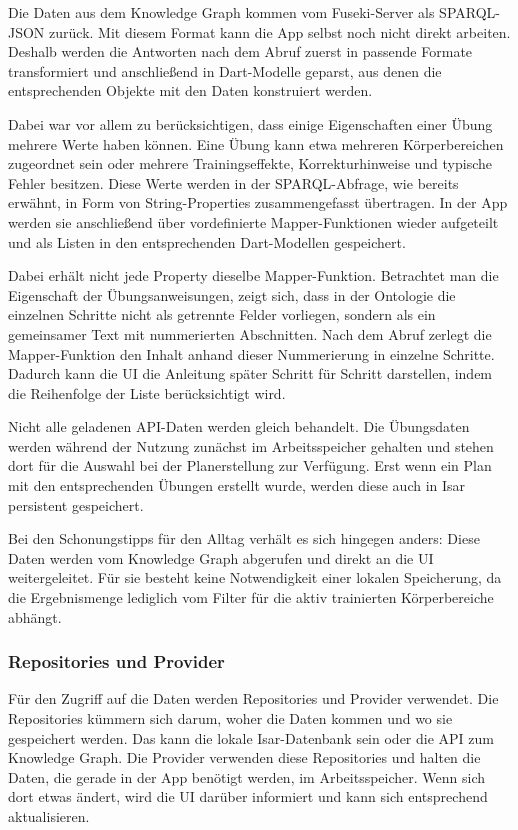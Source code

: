 Die Daten aus dem Knowledge Graph kommen vom Fuseki-Server als SPARQL-JSON zurück. Mit diesem Format kann die App selbst noch nicht direkt arbeiten. Deshalb werden die Antworten nach dem Abruf zuerst in passende Formate transformiert und anschließend in Dart-Modelle geparst, aus denen die entsprechenden Objekte mit den Daten konstruiert werden.

Dabei war vor allem zu berücksichtigen, dass einige Eigenschaften einer Übung mehrere Werte haben können. Eine Übung kann etwa mehreren Körperbereichen zugeordnet sein oder mehrere Trainingseffekte, Korrekturhinweise und typische Fehler besitzen. Diese Werte werden in der SPARQL-Abfrage, wie bereits erwähnt, in Form von String-Properties zusammengefasst übertragen. In der App werden sie anschließend über vordefinierte Mapper-Funktionen wieder aufgeteilt und als Listen in den entsprechenden Dart-Modellen gespeichert.

Dabei erhält nicht jede Property dieselbe Mapper-Funktion. Betrachtet man die Eigenschaft der Übungsanweisungen, zeigt sich, dass in der Ontologie die einzelnen Schritte nicht als getrennte Felder vorliegen, sondern als ein gemeinsamer Text mit nummerierten Abschnitten. Nach dem Abruf zerlegt die Mapper-Funktion den Inhalt anhand dieser Nummerierung in einzelne Schritte. Dadurch kann die UI die Anleitung später Schritt für Schritt darstellen, indem die Reihenfolge der Liste berücksichtigt wird.

Nicht alle geladenen API-Daten werden gleich behandelt. Die Übungsdaten werden während der Nutzung zunächst im Arbeitsspeicher gehalten und stehen dort für die Auswahl bei der Planerstellung zur Verfügung. Erst wenn ein Plan mit den entsprechenden Übungen erstellt wurde, werden diese auch in Isar persistent gespeichert.

Bei den Schonungstipps für den Alltag verhält es sich hingegen anders: Diese Daten werden vom Knowledge Graph abgerufen und direkt an die UI weitergeleitet. Für sie besteht keine Notwendigkeit einer lokalen Speicherung, da die Ergebnismenge lediglich vom Filter für die aktiv trainierten Körperbereiche abhängt.

\subsubsection{Repositories und Provider}
\label{sec:api-repos}

Für den Zugriff auf die Daten werden Repositories und Provider verwendet. Die Repositories kümmern sich darum, woher die Daten kommen und wo sie gespeichert werden. Das kann die lokale Isar-Datenbank sein oder die API zum Knowledge Graph. Die Provider verwenden diese Repositories und halten die Daten, die gerade in der App benötigt werden, im Arbeitsspeicher. Wenn sich dort etwas ändert, wird die UI darüber informiert und kann sich entsprechend aktualisieren.

